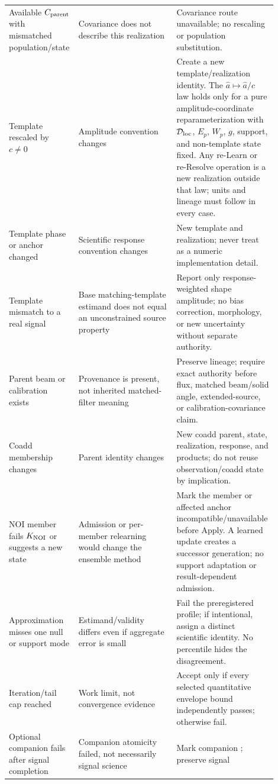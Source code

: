 \begin{longtable}{p{0.22\linewidth}p{0.36\linewidth}p{0.32\linewidth}}
Available $C_{\rm parent}$ with mismatched population/state & Covariance does
not describe this realization & Covariance route unavailable; no rescaling or
population substitution. \\
Template rescaled by $c\neq0$ & Amplitude convention changes & Create a new
template/realization identity. The $\widehat a\mapsto\widehat a/c$ law holds
only for a pure amplitude-coordinate reparameterization with
$\mathcal{D}_{\rm loc}$, $E_p$, $W_p$, $g$, support, and non-template state fixed.
Any re-Learn or re-Resolve operation is a new realization outside that law;
units and lineage must follow in every case. \\
Template phase or anchor changed & Scientific response convention changes &
New template and realization; never treat as a numeric implementation detail. \\
Template mismatch to a real signal & Base matching-template estimand does not
equal an unconstrained source property & Report only response-weighted shape
amplitude; no bias correction, morphology, or new uncertainty without separate
authority. \\
Parent beam or calibration exists & Provenance is present, not inherited
matched-filter meaning & Preserve lineage; require exact authority before flux,
matched beam/solid angle, extended-source, or calibration-covariance claim. \\
Coadd membership changes & Parent identity changes & New coadd parent, state,
realization, response, and products; do not reuse observation/coadd state by
implication. \\
NOI member fails $K_{\rm NOI}$ or suggests a new state & Admission or per-member
relearning would change the ensemble method & Mark the member or affected
anchor incompatible/unavailable before Apply. A learned update creates a
successor generation; no support adaptation or result-dependent admission. \\
Approximation misses one null or support mode & Estimand/validity differs even
if aggregate error is small & Fail the preregistered profile; if intentional,
assign a distinct scientific identity. No percentile hides the disagreement. \\
Iteration/tail cap reached & Work limit, not convergence evidence & Accept only
if every selected quantitative envelope bound independently passes; otherwise
fail. \\
Optional companion fails after signal completion & Companion atomicity failed,
not necessarily signal science & Mark companion \Failed{}; preserve signal

\end{longtable}
